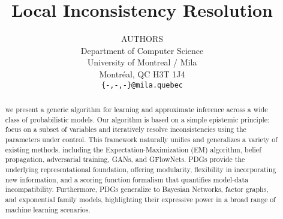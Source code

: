 \documentclass{article} %
\title{Local Inconsistency Resolution}
\author{
AUTHORS \\
Department of Computer Science\\
University of Montreal / Mila\\
Montr\'{e}al, QC H3T 1J4 \\
\texttt{\{-,-,-\}@mila.quebec}
}
\theoremstyle{plain}
\theoremstyle{definition}
\theoremstyle{remark}
\begin{document}
\maketitle

\begin{abstract}
    we present a generic algorithm for learning and approximate inference across a wide class of probabilistic models. Our algorithm is based on a simple epistemic principle: focus on a subset of variables and iteratively resolve inconsistencies using the parameters under control. This framework naturally unifies and generalizes a variety of existing methods, including the Expectation-Maximization (EM) algorithm, belief propagation, adversarial training, GANs, and GFlowNets. PDGs provide the underlying representational foundation, offering modularity, flexibility in incorporating new information, and a scoring function formalism that quantifies model-data incompatibility. Furthermore, PDGs generalize to  Bayesian Networks, factor graphs, and exponential family models, highlighting their expressive power in a broad range of machine learning scenarios.\end{abstract}
\end{document}
